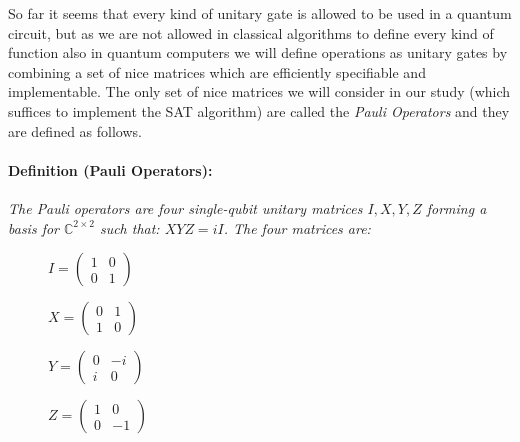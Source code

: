 \documentclass[english]{article}
\begin{document}
				So far it seems that every kind of unitary gate is allowed to be used in a quantum circuit, but as we are not allowed in classical algorithms to define every kind of function also in quantum computers we will define operations as unitary gates by combining a set of nice matrices which are efficiently specifiable and implementable. The only set of nice matrices we will consider in our study (which suffices to implement the SAT algorithm) are called the \emph{Pauli Operators} and they are defined as follows.
				
				\paragraph{Definition (Pauli Operators):} \emph{The Pauli operators are four single-qubit unitary matrices $I, X, Y, Z$ forming a basis for $\mathbb{C}^{2\times2}$ such that: $XYZ=iI$. The four matrices are:}
				\begin{figure}[h]
					\begin{minipage}{0.5\textwidth}
						\centering
						$
						I = \begin{pmatrix}
								1 & 0 \\
								0 & 1
						\end{pmatrix}
						$\vspace{0.2cm}
					\end{minipage}
					\begin{minipage}{0.5\textwidth}
						\centering
						$
						X = \begin{pmatrix}
								0 & 1 \\
								1 & 0
						\end{pmatrix}
						$\vspace{0.2cm}
					\end{minipage}
					\begin{minipage}{0.5\textwidth}
						\centering
						$
						Y = \begin{pmatrix}
								0 & -i \\
								i & 0
						\end{pmatrix}
						$
					\end{minipage}
					\begin{minipage}{0.5\textwidth}
						\centering
						$
						Z = \begin{pmatrix}
								1 & 0 \\
								0 & -1
						\end{pmatrix}
						$
					\end{minipage}
				\end{figure}
			
\end{document}
